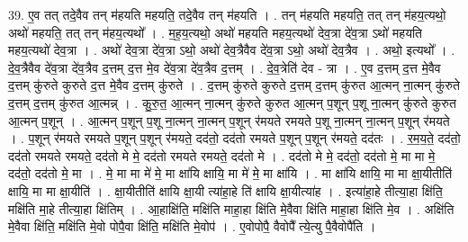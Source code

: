 \documentclass[17pt]{extarticle}
\begin{document}
39. ए॒व तत् तदे॒वैव तन् म॑हयति महयति॒ तदे॒वैव तन् म॑हयति । . तन् म॑हयति महयति॒ तत् तन् म॑हय॒त्यथो॒ अथो॑ महयति॒ तत् तन् म॑हय॒त्यथो᳚ । . म॒ह॒य॒त्यथो॒ अथो॑ महयति महय॒त्यथो॑ देव॒त्रा दे॑व॒त्रा ऽथो॑ महयति महय॒त्यथो॑ देव॒त्रा । . अथो॑ देव॒त्रा दे॑व॒त्रा ऽथो॒ अथो॑ देव॒त्रैवैव दे॑व॒त्रा ऽथो॒ अथो॑ देव॒त्रैव । . अथो॒ इत्यथो᳚ । . दे॒व॒त्रैवैव दे॑व॒त्रा दे॑व॒त्रैव द॒त्तम् द॒त्त मे॒व दे॑व॒त्रा दे॑व॒त्रैव द॒त्तम् । . दे॒व॒त्रेति॑ देव - त्रा । . ए॒व द॒त्तम् द॒त्त मे॒वैव द॒त्तम् कु॑रुते कुरुते द॒त्त मे॒वैव द॒त्तम् कु॑रुते । . द॒त्तम् कु॑रुते कुरुते द॒त्तम् द॒त्तम् कु॑रुत आ॒त्मन् ना॒त्मन् कु॑रुते द॒त्तम् द॒त्तम् कु॑रुत आ॒त्मन्न् । . कु॒रु॒त॒ आ॒त्मन् ना॒त्मन् कु॑रुते कुरुत आ॒त्मन् प॒शून् प॒शू ना॒त्मन् कु॑रुते कुरुत आ॒त्मन् प॒शून् । . आ॒त्मन् प॒शून् प॒शू ना॒त्मन् ना॒त्मन् प॒शून् र॑मयते रमयते प॒शू ना॒त्मन् ना॒त्मन् प॒शून् र॑मयते । . प॒शून् र॑मयते रमयते प॒शून् प॒शून् र॑मयते॒ दद॑तो॒ दद॑तो रमयते प॒शून् प॒शून् र॑मयते॒ दद॑तः । . र॒म॒य॒ते॒ दद॑तो॒ दद॑तो रमयते रमयते॒ दद॑तो मे मे॒ दद॑तो रमयते रमयते॒ दद॑तो मे । . दद॑तो मे मे॒ दद॑तो॒ दद॑तो मे॒ मा मा मे॒ दद॑तो॒ दद॑तो मे॒ मा । . मे॒ मा मा मे॑ मे॒ मा क्षा॑यि क्षायि॒ मा मे॑ मे॒ मा क्षा॑यि । . मा क्षा॑यि क्षायि॒ मा मा क्षा॒यीतीति॑ क्षायि॒ मा मा क्षा॒यीति॑ । . क्षा॒यीतीति॑ क्षायि क्षा॒यी त्या॑हा॒हे ति॑ क्षायि क्षा॒यीत्या॑ह । . इत्या॑हा॒हे तीत्या॒हा क्षि॑ति॒ मक्षि॑ति मा॒हे तीत्या॒हा क्षि॑तिम् । . आ॒हाक्षि॑ति॒ मक्षि॑ति माहा॒हा क्षि॑ति मे॒वैवा क्षि॑ति माहा॒हा क्षि॑ति मे॒व । . अक्षि॑ति मे॒वैवा क्षि॑ति॒ मक्षि॑ति मे॒वो पोपै॒वा क्षि॑ति॒ मक्षि॑ति मे॒वोप॑ । . ए॒वोपोपै॒ वैवोपै᳚ त्ये॒त्यु पै॒वैवोपै॑ति । \newline
\end{document}
